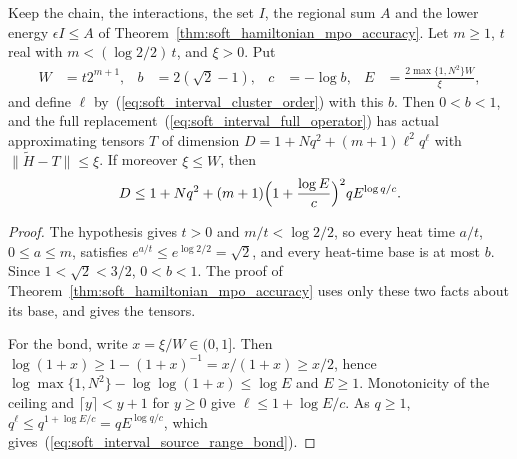 \begin{lemma}
    \label{thm:soft_hamiltonian_mpo_source_range}
    \leanok

    Keep the chain, the interactions, the set $I$, the regional sum $A$
    and the lower energy $\epsilon I\leq A$ of
    Theorem~\ref{thm:soft_hamiltonian_mpo_accuracy}. Let $m\geq1$,
    $t$ real with $m<(\log2/2)\,t$, and $\xi>0$. Put
    \begin{align}
        W & =t2^{m+1},                    & b & =2(\sqrt2-1), & c & =-\log b, &
        E & =\frac{2\max\{1,N^2\}W}{\xi},
        \label{eq:soft_interval_source_range_constants}
    \end{align}
    and define $\ell$ by~(\ref{eq:soft_interval_cluster_order}) with this $b$.
    Then $0<b<1$, and the full replacement~(\ref{eq:soft_interval_full_operator})
    has actual approximating tensors $T$ of dimension
    $D=1+Nq^2+(m+1)\ell^2q^\ell$ with
    $\|\widetilde H-T\|\leq\xi$. If moreover $\xi\leq W$, then
    \begin{align}
        D\leq1+Nq^2+(m+1)\Bigl(1+\frac{\log E}{c}\Bigr)^2qE^{\log q/c}.
        \label{eq:soft_interval_source_range_bond}
    \end{align}
\end{lemma}
\begin{proof}\leanok
    The hypothesis gives $t>0$ and $m/t<\log2/2$, so every heat time
    $a/t$, $0\leq a\leq m$, satisfies $e^{a/t}\leq e^{\log2/2}=\sqrt2$,
    and every heat-time base is at most $b$. Since $1<\sqrt2<3/2$,
    $0<b<1$. The proof of Theorem~\ref{thm:soft_hamiltonian_mpo_accuracy}
    uses only these two facts about its base, and gives the tensors.

    For the bond, write $x=\xi/W\in(0,1]$. Then
    $\log(1+x)\geq1-(1+x)^{-1}=x/(1+x)\geq x/2$, hence
    $\log\max\{1,N^2\}-\log\log(1+x)\leq\log E$ and $E\geq1$.
    Monotonicity of the ceiling and $\lceil y\rceil<y+1$ for $y\geq0$
    give $\ell\leq1+\log E/c$. As $q\geq1$,
    $q^\ell\leq q^{1+\log E/c}=qE^{\log q/c}$, which
    gives~(\ref{eq:soft_interval_source_range_bond}).
\end{proof}

